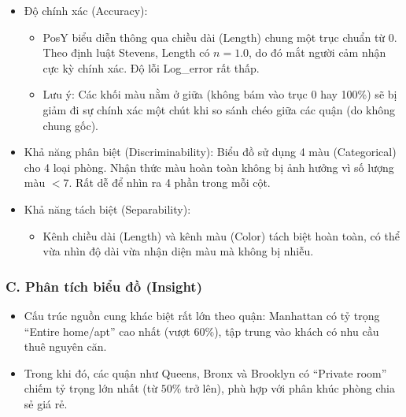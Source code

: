 \begin{itemize}
    \item Độ chính xác (Accuracy):
    \begin{itemize}
        \item PosY biểu diễn thông qua chiều dài (Length) chung một trục chuẩn từ 0. Theo định luật Stevens, Length có $n = 1.0$, do đó mắt người cảm nhận cực kỳ chính xác. Độ lỗi Log\_error rất thấp.
        \item Lưu ý: Các khối màu nằm ở giữa (không bám vào trục 0 hay 100\%) sẽ bị giảm đi sự chính xác một chút khi so sánh chéo giữa các quận (do không chung gốc).
    \end{itemize}
    \item Khả năng phân biệt (Discriminability): Biểu đồ sử dụng 4 màu (Categorical) cho 4 loại phòng. Nhận thức màu hoàn toàn không bị ảnh hưởng vì số lượng màu $< 7$. Rất dễ để nhìn ra 4 phần trong mỗi cột.
    \item Khả năng tách biệt (Separability):
    \begin{itemize}
        \item Kênh chiều dài (Length) và kênh màu (Color) tách biệt hoàn toàn, có thể vừa nhìn độ dài vừa nhận diện màu mà không bị nhiễu.
    \end{itemize}
\end{itemize}

\subsubsection*{C. Phân tích biểu đồ (Insight)}

\begin{itemize}
    \item Cấu trúc nguồn cung khác biệt rất lớn theo quận: Manhattan có tỷ trọng ``Entire home/apt'' cao nhất (vượt $60\%$), tập trung vào khách có nhu cầu thuê nguyên căn.
    \item Trong khi đó, các quận như Queens, Bronx và Brooklyn có ``Private room'' chiếm tỷ trọng lớn nhất (từ $50\%$ trở lên), phù hợp với phân khúc phòng chia sẻ giá rẻ.
\end{itemize}
